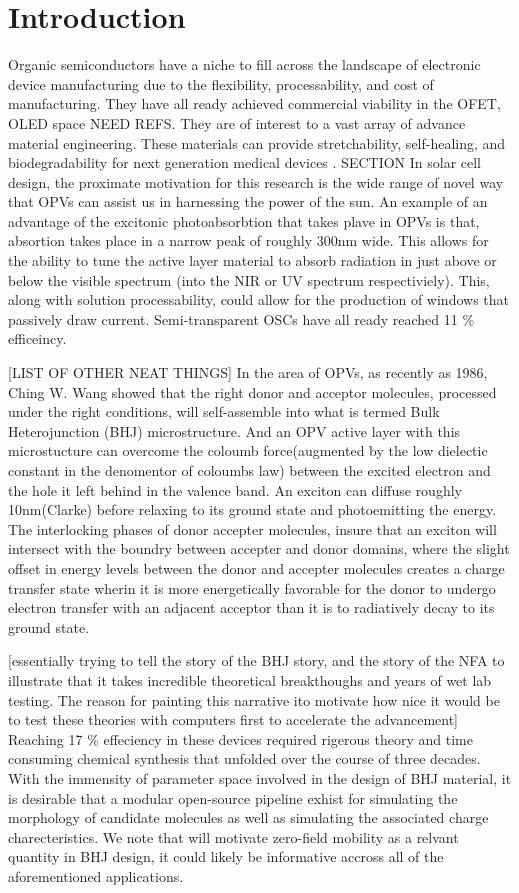 \chapter{Introduction} 
Organic semiconductors have a niche to fill across the landscape of electronic
device manufacturing due to the flexibility, processability, and cost of manufacturing. They have all ready
achieved commercial viability in the OFET, OLED space NEED REFS. They are of interest to a vast array of
advance material engineering. These materials can
provide stretchability, self-healing, and biodegradability for next generation medical devices
\cite{Brutting2006}.
SECTION
In solar cell design, the proximate motivation for this research is the wide range of novel way that OPVs
can assist us in harnessing the power of the sun. 
An example of an advantage of the excitonic photoabsorbtion that takes plave in OPVs is that, absortion takes place in a narrow peak of roughly 300nm
wide.
This allows for the ability to tune the active layer material to absorb radiation in just above or below the
visible spectrum (into the NIR or UV spectrum respectiviely). This, along with solution processability, 
could allow for the production of windows that passively draw current. Semi-transparent OSCs have all ready
reached 11 \% efficeincy. \cite{Brabec2020}


[LIST OF OTHER NEAT THINGS] In the area of OPVs, as recently as 1986, Ching W. Wang
showed that the right donor and acceptor molecules, processed under the right conditions, will self-assemble
into what is termed Bulk Heterojunction (BHJ) microstructure. And an OPV active layer with this microstucture
can overcome the
coloumb force(augmented by the low dielectic constant in the denomentor of coloumbs law) between the excited
electron and the hole it left behind in the valence band. An exciton can diffuse roughly 10nm(Clarke) before relaxing
to its ground state and photoemitting the energy. The interlocking phases of donor accepter molecules, insure
that an exciton will intersect with the boundry between accepter and donor domains, where the slight offset in
energy levels between the donor and accepter molecules creates a charge transfer state wherin it is more
energetically favorable for the donor to undergo electron transfer with an adjacent acceptor than it is to radiatively decay to its ground state.

[essentially trying to tell the story of the BHJ story, and the story of the NFA to illustrate that it takes
incredible theoretical breakthoughs and years of wet lab testing. The reason for painting this narrative ito
motivate how nice it would be to test these theories with computers first to accelerate the
advancement]
Reaching 17 \% effeciency in these devices required rigerous theory and time consuming chemical synthesis
that unfolded over the course of three decades. 
With the immensity of parameter space involved in the design of BHJ material, it is desirable that a modular
open-source pipeline exhist for simulating the morphology of candidate molecules as well as simulating the 
associated charge charecteristics. We note that will motivate zero-field mobility as a relvant quantity in BHJ
design, it could likely be informative accross all of the aforementioned applications. 


